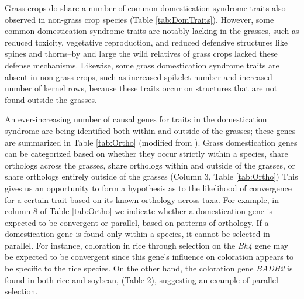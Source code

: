 \documentclass[12pt]{article}
\begin{document}
Grass crops do share a number of common domestication syndrome traits also observed in non-grass crop species (Table \ref{tab:DomTraits}).
However, some common domestication syndrome traits are notably lacking in the grasses, such as reduced toxicity, vegetative reproduction, and reduced defensive structures like spines and thorns--by and large the wild relatives of grass crops lacked these defense mechanisms.
Likewise, some grass domestication syndrome traits are absent in non-grass crops, such as increased spikelet number and increased number of kernel rows, because these traits occur on structures that are not found outside the grasses.  

An ever-increasing number of causal genes for traits in the domestication syndrome are being identified both within and outside of the grasses; these genes are summarized in Table \ref{tab:Ortho} (modified from \citep{Lenser2013}).
Grass domestication genes can be categorized based on whether they occur strictly within a species, share orthologs across the grasses, share orthologs within and outside of the grasses, or share orthologs entirely outside of the grasses (Column 3, Table \ref{tab:Ortho})
This gives us an opportunity to form a hypothesis as to the likelihood of convergence for a certain trait based on its known orthology across taxa. 
For example, in column 8 of Table \ref{tab:Ortho} we indicate whether a domestication gene is expected to be convergent or parallel, based on patterns of orthology.
If a domestication gene is found only within a species, it cannot be selected in parallel.
For instance, coloration in rice through selection on the \textit{Bh4} gene may be expected to be convergent since this gene's influence on coloration appears to be specific to the rice species.
On the other hand, the coloration gene \textit{BADH2} is found in both rice and soybean, (Table 2), suggesting an example of parallel selection.
\end{document}
